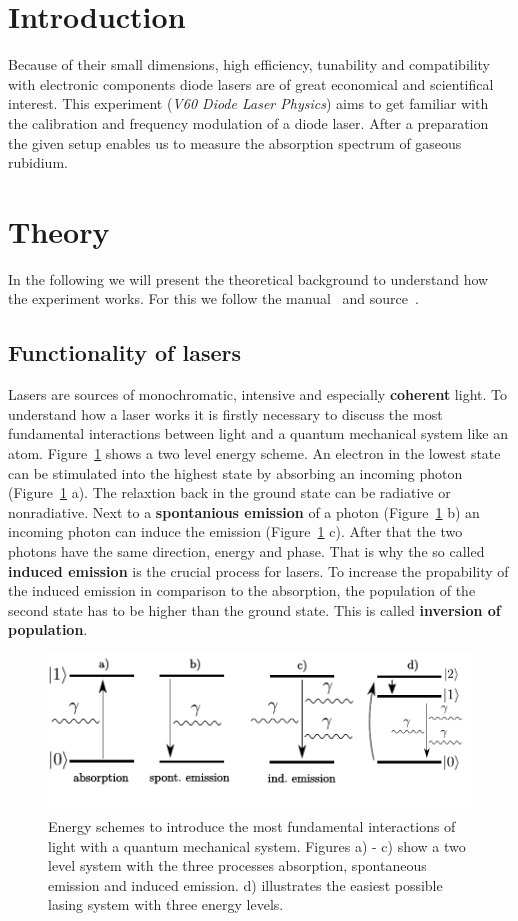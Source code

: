 \setcounter{page}{1}
\section*{Introduction}
Because of their small dimensions, high efficiency, tunability and compatibility with electronic components
diode lasers are of great economical and scientifical interest. This experiment (\emph{V60 Diode Laser Physics}) aims to get familiar
with the calibration and frequency modulation of a diode laser. After a preparation the given setup enables us to measure
the absorption spectrum of gaseous rubidium.

\section{Theory}
In the following we will present the theoretical background to understand how the experiment works. 
For this we follow the manual~\cite{anleitung60} and source~\cite{eichler}.

\subsection{Functionality of lasers}
Lasers are sources of monochromatic, intensive and especially \textbf{coherent} light.
To understand how a laser works it is firstly necessary to discuss the most fundamental interactions between light and
a quantum mechanical system like an atom. Figure~\ref{fig: two_level} shows a two level energy scheme. An electron in the
lowest state can be stimulated into the highest state by absorbing an incoming photon (Figure~\ref{fig: two_level} a). The relaxtion back in the
ground state can be radiative or nonradiative. Next to a \textbf{spontanious emission} of a photon (Figure~\ref{fig: two_level} b)
an incoming photon can induce the emission (Figure~\ref{fig: two_level} c). After that the two photons have the same direction, energy and phase.
That is why the so called \textbf{induced emission} is the crucial process for lasers. To increase the propability of the induced emission in
comparison to the absorption, the population of the second state has to be higher than the ground state. This is called
\textbf{inversion of population}.

\begin{figure}
  \centering
  \includegraphics[scale = 0.9]{pics/energyscheme.pdf}
  \caption{Energy schemes to introduce the most fundamental interactions of light with a quantum mechanical system. Figures a) - c) show
  a two level system with the three processes absorption, spontaneous emission and induced emission. d) illustrates the easiest possible lasing
  system with three energy levels.}
  \label{fig: two_level}
\end{figure}


